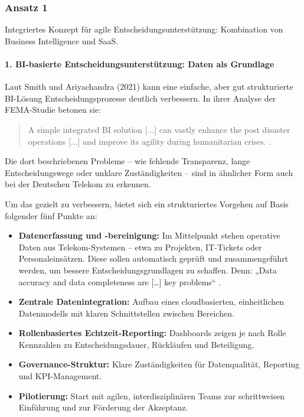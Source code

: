 \documentclass[12pt,a4paper]{article}
\begin{document}
	\subsubsection{Ansatz 1}
	Integriertes Konzept für agile Entscheidungsunterstützung: Kombination von Business Intelligence und SaaS.
	
	\paragraph{1. BI-basierte Entscheidungsunterstützung: Daten als Grundlage}
	
	Laut Smith und Ariyachandra (2021) kann eine einfache, aber gut strukturierte BI-Lösung Entscheidungsprozesse deutlich verbessern. In ihrer Analyse der FEMA-Studie betonen sie:
	
	\begin{quote}
		A simple integrated BI solution [...] can vastly enhance the post disaster operations [...] and improve its agility during humanitarian crises. \parencite[210]{rahman_achieving_2022}.
	\end{quote} 
	
	\noindent Die dort beschriebenen Probleme – wie fehlende Transparenz, lange Entscheidungswege oder unklare Zuständigkeiten – sind in ähnlicher Form auch bei der Deutschen Telekom zu erkennen.
	
	\noindent Um das gezielt zu verbessern, bietet sich ein strukturiertes Vorgehen auf Basis folgender fünf Punkte an:
	
	\begin{itemize}
		\item \textbf{Datenerfassung und -bereinigung:} Im Mittelpunkt stehen operative Daten aus Telekom-Systemen – etwa zu Projekten, IT-Tickets oder Personaleinsätzen. Diese sollen automatisch geprüft und zusammengeführt werden, um bessere Entscheidungsgrundlagen zu schaffen. Denn: „Data accuracy and data completeness are […] key problems“ \parencite[S.~201]{rahman_achieving_2022}.
		
		\item \textbf{Zentrale Datenintegration:} Aufbau eines cloudbasierten, einheitlichen Datenmodells mit klaren Schnittstellen zwischen Bereichen.
		
		\item \textbf{Rollenbasiertes Echtzeit-Reporting:} Dashboards zeigen je nach Rolle Kennzahlen zu Entscheidungsdauer, Rückläufen und Beteiligung.
		
		\item \textbf{Governance-Struktur:} Klare Zuständigkeiten für Datenqualität, Reporting und KPI-Management.
		
		\item \textbf{Pilotierung:} Start mit agilen, interdisziplinären Teams zur schrittweisen Einführung und zur Förderung der Akzeptanz.
	\end{itemize}
	
\end{document}
